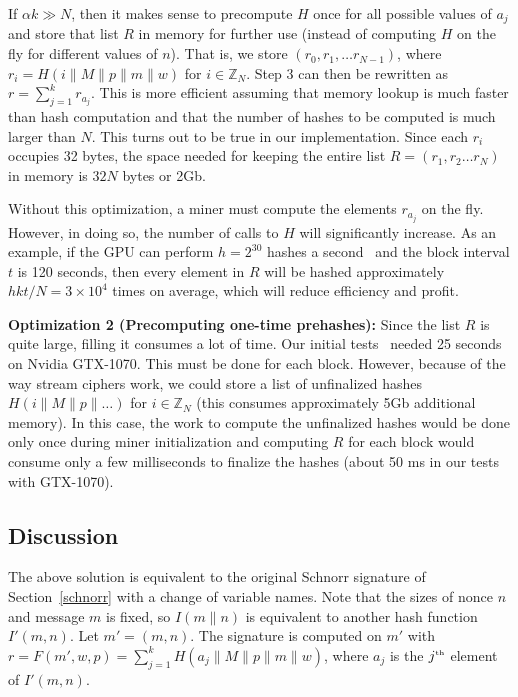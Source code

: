 \documentclass[11pt]{article}
\begin{document}
If $\alpha k \gg N$, then it makes sense to precompute $H$ once for all possible values of $a_j$ and store that list $R$ in memory for further use (instead of computing $H$ on the fly for different values of $n$). That is, we store $(r_0, r_1, \ldots r_{N-1})$, where $r_i = H(i\|M\|{p}\|m\|w)$ for $i\in \mathbb{Z}_N$. Step 3 can then be rewritten as $r = \sum^{k}_{j=1}r_{a_j}$. This is more efficient assuming that memory lookup is much faster than hash computation and that the number of hashes to be computed is much larger than $N$. 
This turns out to be true in our implementation.
Since each $r_i$ occupies 32 bytes, the space needed for keeping the entire list $R = (r_1, r_2\ldots r_N)$ in memory is $32N$ bytes or 2Gb. 

Without this optimization, a miner must compute the elements $r_{a_j}$ on the fly. However, in doing so, the number of calls to $H$ will significantly increase. As an example, if the GPU can perform $h = 2^{30}$ hashes a second~\cite{ref} and the block interval $t$ is 120 seconds, then every element in $R$ will be hashed approximately $hkt/N = 3\times 10^4$ times on average, which will reduce efficiency and profit.

\textbf{Optimization 2 (Precomputing one-time prehashes):} Since the list $R$ is quite large, filling it consumes a lot of time. Our initial tests~\cite{impl} needed 25 seconds on Nvidia GTX-1070.
This must be done for each block. However, because of the way stream ciphers work, we could store a list of unfinalized hashes 
$H(i\|M\|{p}\|\ldots)$ for $i\in \mathbb{Z}_N$ (this consumes approximately 5Gb additional memory).
In this case, the work to compute the unfinalized hashes would be done only once during miner initialization and computing $R$ for each block would consume only a few milliseconds to finalize the hashes (about 50 ms in our tests with GTX-1070).


\subsection{Discussion}
\label{impl}
The above solution is equivalent to the original Schnorr signature of Section~\ref{schnorr} with a change of variable names. 
Note that the sizes of nonce $n$ and message $m$ is fixed, so $I(m\|n)$ is equivalent to another hash function ${I}'(m, n)$.
Let ${m'} = (m, n)$. The signature is computed on ${m'}$ with 
$r = F({m'},w,{p}) = \sum^{k}_{j=1}H(a_j\|M\|{p}\|m\|w)$, where $a_j$ is the $j^{\tiny\mbox{th}}$ element of ${I'}(m,n)$.
\end{document}
